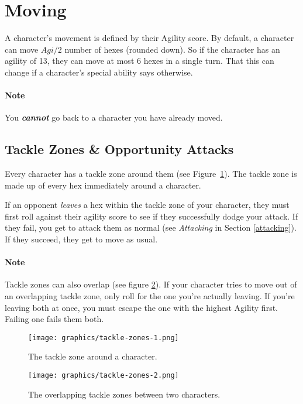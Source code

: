 \section{Moving} \label{moving}
A character's movement is defined by their Agility score.
By default, a character can move $Agi / 2$ number of hexes (rounded down).
So if the character has an agility of 13, they can move at most 6 hexes in a single turn.
That this can change if a character's special ability says otherwise.

\paragraph{Note} You \textit{\textbf{cannot}} go back to a character you have already moved.

\subsection{Tackle Zones \& Opportunity Attacks}
Every character has a tackle zone around them (see Figure~\ref{fig:tackle-zone-1}).
The tackle zone is made up of every hex immediately around a character.

If an opponent \textit{leaves} a hex within the tackle zone of your character, they must first roll against their agility score to see if they successfully dodge your attack.
If they fail, you get to attack them as normal (see \textit{Attacking} in Section \ref{attacking}).
If they succeed, they get to move as usual.

\paragraph{Note} Tackle zones can also overlap (see figure \ref{fig:tackle-zone-2}).
If your character tries to move out of an overlapping tackle zone, only roll for the one you're actually leaving.
If you're leaving both at once, you must escape the one with the highest Agility first.
Failing one fails them both.

\begin{figure}
    \centering
    \texttt{[image: graphics/tackle-zones-1.png]}
    \caption{The tackle zone around a character.}
    \label{fig:tackle-zone-1}
\end{figure}

\begin{figure}
    \centering
    \texttt{[image: graphics/tackle-zones-2.png]}
    \caption{The overlapping tackle zones between two characters.}
    \label{fig:tackle-zone-2}
\end{figure}
